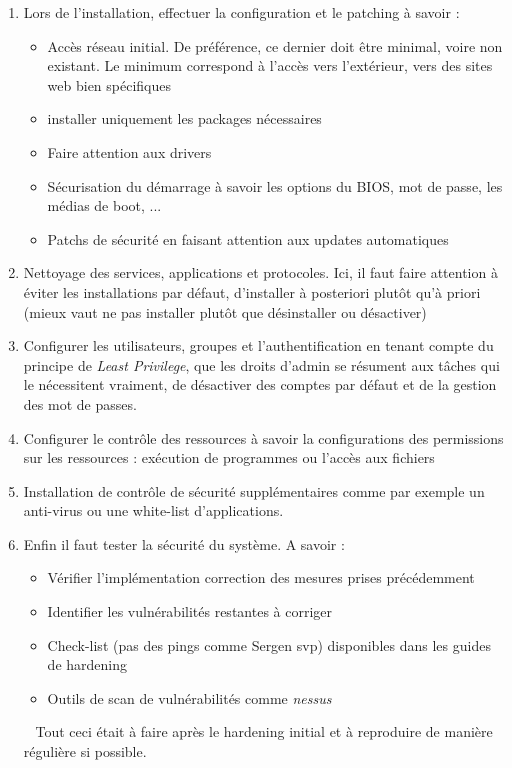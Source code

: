 \documentclass{report}
\begin{document}
\begin{enumerate}
    \item Lors de l'installation, effectuer la configuration et le patching à savoir :
    \begin{itemize}
        \item Accès réseau initial. De préférence, ce dernier doit être minimal, voire non existant. Le minimum correspond à l'accès vers l'extérieur, vers des sites web bien spécifiques
        \item installer uniquement les packages nécessaires
        \item Faire attention aux drivers
        \item Sécurisation du démarrage à savoir les options du BIOS, mot de passe, les médias de boot, ...
        \item Patchs de sécurité en faisant attention aux updates automatiques
    \end{itemize}

    \item Nettoyage des services, applications et protocoles. Ici, il faut faire attention à éviter les installations par défaut, d'installer à posteriori plutôt qu'à priori (mieux vaut ne pas installer plutôt que désinstaller ou désactiver)

    \item Configurer les utilisateurs, groupes et l'authentification en tenant compte du principe de \textit{Least Privilege}, que les droits d'admin se résument aux tâches qui le nécessitent vraiment, de désactiver des comptes par défaut et de la gestion des mot de passes.

    \item Configurer le contrôle des ressources à savoir la configurations des permissions sur les ressources : exécution de programmes ou l'accès aux fichiers

    \item Installation de contrôle de sécurité supplémentaires comme par exemple un anti-virus ou une white-list d'applications.

    \item Enfin il faut tester la sécurité du système. A savoir :
    \begin{itemize}
        \item Vérifier l'implémentation correction des mesures prises précédemment
        \item Identifier les vulnérabilités restantes à corriger
        \item Check-list (pas des pings comme Sergen svp) disponibles dans les guides de hardening
        \item Outils de scan de vulnérabilités comme \textit{nessus}
    \end{itemize}~
    Tout ceci était à faire après le hardening initial et à reproduire de manière régulière si possible.
\end{enumerate}
\end{document}
